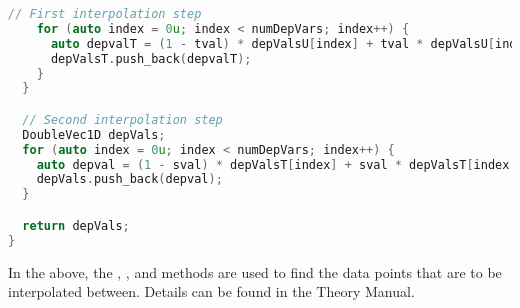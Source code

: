 \begin{lstlisting}[language=Cpp]
    // First interpolation step
    for (auto index = 0u; index < numDepVars; index++) {
      auto depvalT = (1 - tval) * depValsU[index] + tval * depValsU[index + numDepVars];
      depValsT.push_back(depvalT);
    }
  }

  // Second interpolation step
  DoubleVec1D depVals;
  for (auto index = 0u; index < numDepVars; index++) {
    auto depval = (1 - sval) * depValsT[index] + sval * depValsT[index + numDepVars];
    depVals.push_back(depval);
  }

  return depVals;
}
\end{lstlisting}
In the above, the , , and 
methods are used to find the data points that are to be interpolated between.  Details can be
found in the \Vaango Theory Manual.
